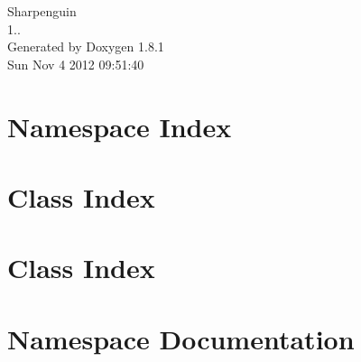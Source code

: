 \documentclass{book}
\begin{document}
\hypersetup{pageanchor=false,citecolor=blue}
\begin{titlepage}
\vspace*{7cm}
\begin{center}
{\Large Sharpenguin \\[1ex]\large 1.. }\\
\vspace*{1cm}
{\large Generated by Doxygen 1.8.1}\\
\vspace*{0.5cm}
{\small Sun Nov 4 2012 09:51:40}\\
\end{center}
\end{titlepage}
\clearemptydoublepage
{}
\tableofcontents
\clearemptydoublepage
{}
\hypersetup{pageanchor=true,citecolor=blue}
\chapter{Namespace Index}

\chapter{Class Index}

\chapter{Class Index}

\chapter{Namespace Documentation}










\end{document}
